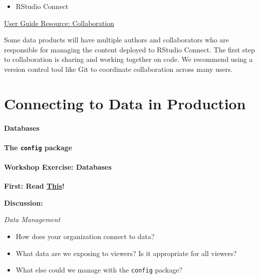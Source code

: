 \documentclass[]{book}
\providecommand{\tightlist}{%
  \setlength{\itemsep}{0pt}\setlength{\parskip}{0pt}}
\theoremstyle{definition}
\theoremstyle{definition}
\theoremstyle{definition}
\theoremstyle{remark}
\begin{document}
\begin{itemize}
\tightlist
\item
  RStudio Connect
\end{itemize}

\href{https://docs.rstudio.com/connect/user/publishing.html\#collaboration}{User
Guide Resource: Collaboration}

Some data products will have multiple authors and collaborators who are
responsible for managing the content deployed to RStudio Connect. The
first step to collaboration is sharing and working together on code. We
recommend using a version control tool like Git to coordinate
collaboration across many users.

\hypertarget{connecting-to-data-in-production}{%
\chapter{Connecting to Data in
Production}\label{connecting-to-data-in-production}}

\hypertarget{databases}{%
\subsubsection{Databases}\label{databases}}

\hypertarget{the-config-package}{%
\subsubsection{\texorpdfstring{The \texttt{config}
package}{The config package}}\label{the-config-package}}

\hypertarget{workshop-exercise-databases}{%
\subsubsection{Workshop Exercise:
Databases}\label{workshop-exercise-databases}}

\textbf{First: Read
\href{https://db.rstudio.com/best-practices/portable-code/}{This}!}

\textbf{Discussion:}

\emph{Data Management}

\begin{itemize}
\tightlist
\item
  How does your organization connect to data?
\item
  What data are we exposing to viewers? Is it appropriate for all
  viewers?
\item
  What else could we manage with the \texttt{config} package?
\end{itemize}
\end{document}
